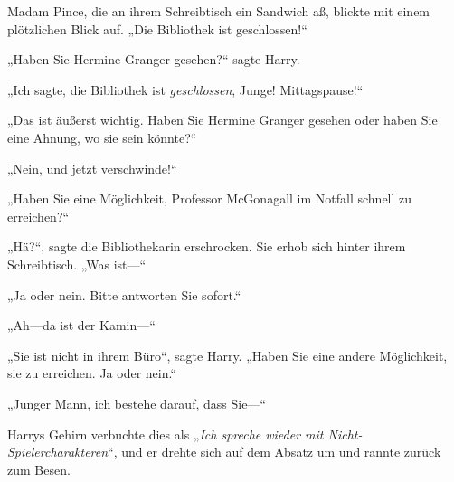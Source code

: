 Madam Pince, die an ihrem Schreibtisch ein Sandwich aß, blickte mit einem plötzlichen Blick auf.
„Die Bibliothek ist geschlossen!“

„Haben Sie Hermine Granger gesehen?“ sagte Harry.

„Ich sagte, die Bibliothek ist \emph{geschlossen}, Junge! Mittagspause!“

„Das ist äußerst wichtig. Haben Sie Hermine Granger gesehen oder haben Sie eine Ahnung, wo sie sein könnte?“

„Nein, und jetzt verschwinde!“

„Haben Sie eine Möglichkeit, Professor McGonagall im Notfall schnell zu erreichen?“

„Hä?“, sagte die Bibliothekarin erschrocken. Sie erhob sich hinter ihrem Schreibtisch.
„Was ist—“

„Ja oder nein. Bitte antworten Sie sofort.“

„Ah—da ist der Kamin—“

„Sie ist nicht in ihrem Büro“, sagte Harry.
„Haben Sie eine andere Möglichkeit, sie zu erreichen. Ja oder nein.“

„Junger Mann, ich bestehe darauf, dass Sie—“

Harrys Gehirn verbuchte dies als „\emph{Ich spreche wieder mit Nicht-Spielercharakteren}“, und er drehte sich auf dem Absatz um und rannte zurück zum Besen.

